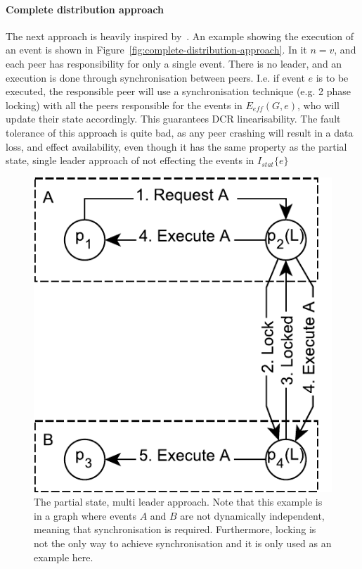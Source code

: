 \documentclass{article}
\begin{document}
	\paragraph{Complete distribution approach}
	The next approach is heavily inspired by~\cite{hildebrandt_safe_2011}.
    An example showing the execution of an event is shown in Figure~\ref{fig:complete-distribution-approach}.
	In it $n = v$, and each peer has responsibility for only a single event.
	There is no leader, and an execution is done through synchronisation between peers.
	I.e. if event $e$ is to be executed, the responsible peer will use a synchronisation technique (e.g. 2 phase locking) with all the peers responsible for the events in $E_{eff}(G,e)$, who will update their state accordingly.
	This guarantees DCR linearisability.
	The fault tolerance of this approach is quite bad, as any peer crashing will result in a data loss, and effect availability, even though it has the same property as the partial state, single leader approach of not effecting the events in $I_{stat}\{e\}$

    \FloatBarrier
    \begin{figure}[ht!]
        \center
        \includegraphics[scale=0.6]{figures/dcr-graphs/partial-state-multi-leader-approach.pdf}
        \caption{The partial state, multi leader approach.
        Note that this example is in a graph where events $A$ and $B$ are not dynamically independent, meaning that synchronisation is required.
        Furthermore, locking is not the only way to achieve synchronisation and it is only used as an example here. }
        \label{fig:partial-state-multi-leader-approach}
    \end{figure}
    \FloatBarrier
\end{document}
